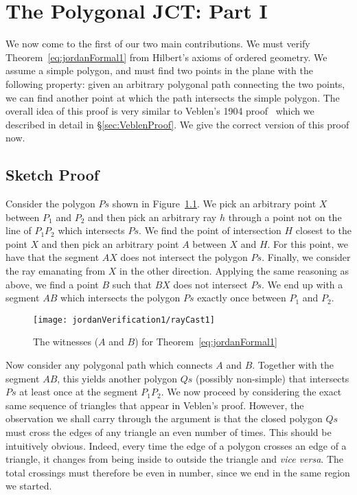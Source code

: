 \chapter{The Polygonal JCT: Part I}\label{chapter:JordanVerification1}
We now come to the first of our two main contributions. We must verify Theorem~\ref{eq:jordanFormal1} from Hilbert's axioms of ordered geometry. We assume a simple polygon, and must find two points in the plane with the following property: given an arbitrary polygonal path connecting the two points, we can find another point at which the path intersects the simple polygon. The overall idea of this proof is very similar to Veblen's 1904 proof~\cite{Veblenphd} which we described in detail in \S\ref{sec:VeblenProof}. We give the correct version of this proof now.

\section{Sketch Proof}\label{sec:ParityProofInformal}
Consider the polygon $Ps$ shown in Figure~\ref{fig:rayCast1}. We pick an arbitrary point $X$ between $P_1$ and $P_2$  and then pick an arbitrary ray $h$ through a point not on the line of $P_1P_2$ which intersects $Ps$. We find the point of intersection $H$ closest to the point $X$ and then pick an arbitrary point $A$ between $X$ and $H$. For this point, we have that the segment $AX$ does not intersect the polygon $Ps$. Finally, we consider the ray emanating from $X$ in the other direction. Applying the same reasoning as above, we find a point $B$ such that $BX$ does not intersect $Ps$. We end up with a segment $AB$ which intersects the polygon $Ps$ exactly once between $P_1$ and $P_2$.

\begin{figure}
\centering\texttt{[image: jordanVerification1/rayCast1]}
\caption{The witnesses ($A$ and $B$) for Theorem~\ref{eq:jordanFormal1}}
\label{fig:rayCast1}
\end{figure}

\newcommand{\insideoutsideclaim}{every time the edge of a polygon crosses an edge of a triangle, it changes from being inside to outside the triangle and \emph{vice versa}}

Now consider any polygonal path which connects $A$ and $B$. Together with the segment $AB$, this yields another polygon $Qs$ (possibly non-simple) that intersects $Ps$ at least once at the segment $P_1P_2$. We now proceed by considering the exact same sequence of triangles that appear in Veblen's proof. However, the observation we shall carry through the argument is that the closed polygon $Qs$ must cross the edges of any triangle an even number of times. This should be intuitively obvious. Indeed, \insideoutsideclaim. The total crossings must therefore be even in number, since we end in the same region we started.

